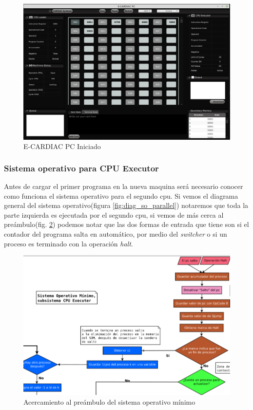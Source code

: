 \documentclass[letterpaper,12pt,oneside]{book}
\begin{document}
			\begin{figure}[h]		
				\centering
				\includegraphics[scale=0.35]{media/Paralela/ecardiacpc_booteado.png}
				\caption{ E-CARDIAC PC Iniciado}
				\label{fig:ecardiacpc_booteado}
			\end{figure}	

			
			
			\subsubsection{Sistema operativo para CPU Executor}
			
				Antes de cargar el primer programa en la nueva maquina será necesario conocer  como funciona el sistema operativo para el
				segundo cpu. Si vemos el diagrama general del sistema operativo(figura \ref{fig:diag_so_parallel}) notaremos que toda la parte izquierda
				es ejecutada por el segundo cpu, si vemos de más cerca al preámbulo(fig. \ref{fig:diag_so_paralel_cpue}) podemos notar que las
				dos formas de entrada que tiene son si el contador del programa salta en automático, por medio del \textit{switcher} o si
				un proceso es terminado con la operación \textit{halt}. 

			
			
			\begin{figure}[h]		
				\centering
				\includegraphics[scale=0.5]{media/Paralela/diag_so_paralel_cpue.png}
				\caption{ Acercamiento al preámbulo del sistema operativo mínimo}
				\label{fig:diag_so_paralel_cpue}
			\end{figure}	
			
\end{document}
